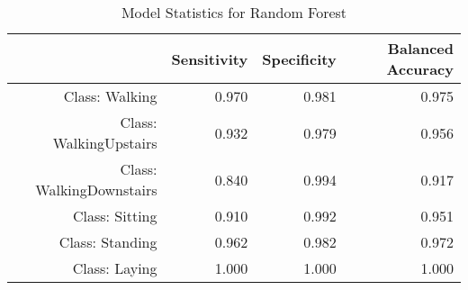 \begin{table}[ht]
\centering
\caption{Model Statistics for Random Forest} 
\label{tab:conmat_stats_rf}
\begin{tabular}{rrrr}
  \hline
 & Sensitivity & Specificity & Balanced Accuracy \\ 
  \hline
Class: Walking & 0.970 & 0.981 & 0.975 \\ 
  Class: WalkingUpstairs & 0.932 & 0.979 & 0.956 \\ 
  Class: WalkingDownstairs & 0.840 & 0.994 & 0.917 \\ 
  Class: Sitting & 0.910 & 0.992 & 0.951 \\ 
  Class: Standing & 0.962 & 0.982 & 0.972 \\ 
  Class: Laying & 1.000 & 1.000 & 1.000 \\ 
   \hline
\end{tabular}
\end{table}
